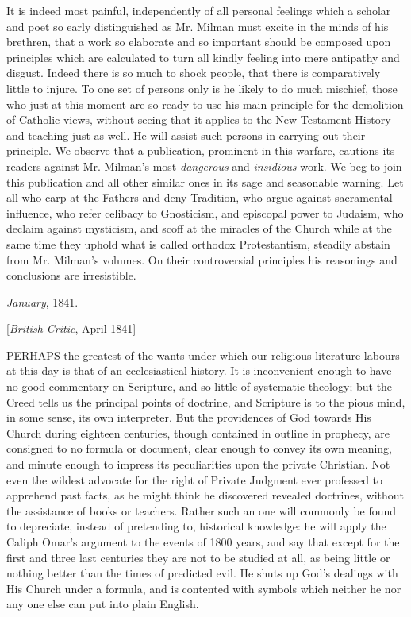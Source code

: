 It is indeed most painful, independently of all
personal feelings which a scholar and poet so early distinguished as
Mr. Milman must excite in the minds of his brethren, that a work so
elaborate and so important should be composed upon principles which
are calculated to turn all kindly feeling into mere antipathy and
disgust. Indeed there is so much to shock people, that there is
comparatively little to injure. To one set of persons only is he
likely to do much mischief, those who just at this moment are so ready
to use his main principle for the demolition of Catholic views,
without seeing that it applies to the New Testament History and
teaching just as well. He will assist such persons in carrying out
their principle. We observe that a publication, prominent in this
warfare, cautions its readers against Mr. Milman's most \emph{dangerous}
and \emph{insidious} work. We beg to join this publication and all
other similar ones in its sage and seasonable warning. Let all who
carp at the Fathers and deny Tradition, who argue against
sacramental influence, who refer celibacy to Gnosticism, and episcopal
power to Judaism, who declaim against mysticism, and scoff at the
miracles of the Church while at the same time they uphold what is
called orthodox Protestantism, steadily abstain from Mr. Milman's
volumes. On their controversial principles his reasonings and
conclusions are irresistible.

\emph{January}, 1841.


[\emph{British Critic}, April 1841]

PERHAPS
the greatest of the wants under which our religious literature labours
at this day is that of an ecclesiastical history. It is inconvenient
enough to have no good commentary on Scripture, and so little of
systematic theology; but the Creed tells us the principal points of
doctrine, and Scripture is to the pious mind, in some sense, its own
interpreter. But the providences of God towards His Church during
eighteen centuries, though contained in outline in prophecy, are
consigned to no formula or document, clear enough to convey its own
meaning, and minute enough to impress its peculiarities upon the
private Christian. Not even the wildest advocate for the right of
Private Judgment ever professed to apprehend past facts, as he might
think he discovered revealed doctrines, without the assistance of
books or teachers. Rather such an one will commonly be found to
depreciate, instead of pretending to, historical knowledge: he will
apply the Caliph Omar's argument to the events of 1800 years, and say
that except for the first and three last centuries they are not to be
studied at all, as being little or nothing better than the times of
predicted evil. He shuts up God's dealings with His Church under
a formula, and is contented with symbols which neither he nor any one
else can put into plain English.


